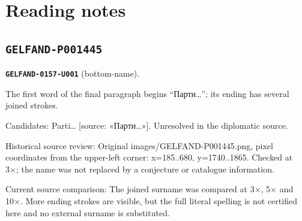 \section*{Reading notes}
\subsection*{\texttt{GELFAND-P001445}}
\par\noindent\leavevmode{}\label{GELFAND-0157-U001}\label{GELFAND-P001445:bottom-name}\textbf{\texttt{GELFAND-0157-U001}} (bottom-name).\nopagebreak[4]\par
The first word of the final paragraph begins “Парти…”; its ending has several joined strokes.\par
Candidates: Parti… [source: «Парти…»]. Unresolved in the diplomatic source.\par
Historical source review: Original images/GELFAND-P001445.png, pixel coordinates from the upper-left corner: x=185..680, y=1740..1865. Checked at 3×; the name was not replaced by a conjecture or catalogue information.\par
Current source comparison: The joined surname was compared at 3×, 5× and 10×. More ending strokes are visible, but the full literal spelling is not certified here and no external surname is substituted.\par\medskip
